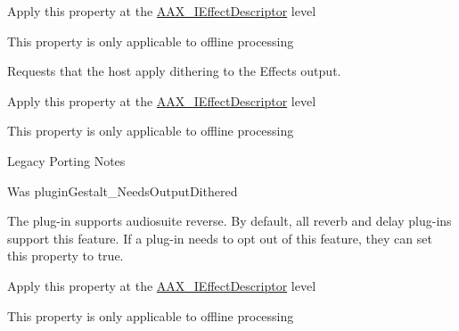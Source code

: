\begin{Desc}
\begin{description}
\begin{DoxyItemize}
\item Apply this property at the \hyperlink{a00096}{A\+A\+X\+\_\+\+I\+Effect\+Descriptor} level \item This property is only applicable to offline processing \end{DoxyItemize}
\item[{\em 
\hypertarget{a00283_a6571f4e41a5dd06e4067249228e2249ea38a26f7d914d391cef1f71acfb98a2ec}{}A\+A\+X\+\_\+e\+Property\+\_\+\+Needs\+Output\+Dithered\label{a00283_a6571f4e41a5dd06e4067249228e2249ea38a26f7d914d391cef1f71acfb98a2ec}
}]Requests that the host apply dithering to the Effect\textquotesingle{}s output. \begin{DoxyItemize}
\item Apply this property at the \hyperlink{a00096}{A\+A\+X\+\_\+\+I\+Effect\+Descriptor} level \item This property is only applicable to offline processing\end{DoxyItemize}
\begin{DoxyRefDesc}{Legacy Porting Notes}
\item[\hyperlink{a00384__porting_notes000058}{Legacy Porting Notes}]Was plugin\+Gestalt\+\_\+\+Needs\+Output\+Dithered \end{DoxyRefDesc}
\item[{\em 
\hypertarget{a00283_a6571f4e41a5dd06e4067249228e2249eab4eefd3dd46fb71883fff754c4f90a57}{}A\+A\+X\+\_\+e\+Property\+\_\+\+Disable\+Audiosuite\+Reverse\label{a00283_a6571f4e41a5dd06e4067249228e2249eab4eefd3dd46fb71883fff754c4f90a57}
}]The plug-\/in supports audiosuite reverse. By default, all reverb and delay plug-\/ins support this feature. If a plug-\/in needs to opt out of this feature, they can set this property to true. \begin{DoxyItemize}
\item Apply this property at the \hyperlink{a00096}{A\+A\+X\+\_\+\+I\+Effect\+Descriptor} level \item This property is only applicable to offline processing \end{DoxyItemize}

\end{description}
\end{Desc}
